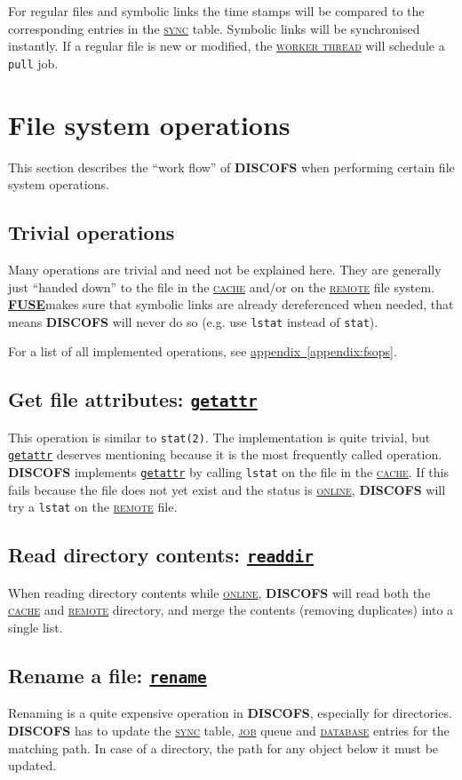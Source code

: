 \documentclass[a4paper]{article}
\newcommand{\software}[1]{\textsc{\textbf{#1}}\xspace}
\newcommand{\discofs}{\software{DISCOFS}}
\newcommand{\fuse}{\href{http://fuse.sourceforge.net/}{\software{FUSE}\xspace}}
\newcommand{\keyword}[1]{\hyperref[keyword:#1]{\textsc{#1}}\xspace}
\newcommand{\job}{\keyword{job}}
\newcommand{\jobtype}[1]{\texttt{#1}\xspace}
\newcommand{\pull}{\jobtype{pull}}
\newcommand{\sync}{\keyword{sync}}
\newcommand{\cache}{\keyword{cache}}
\newcommand{\remote}{\keyword{remote}}
\newcommand{\database}{\keyword{database}}
\newcommand{\online}{\keyword{online}}
\newcommand{\workerthread}{\hyperref[keyword:workerthread]{\textsc{worker thread}}\xspace}
\newcommand{\fsopref}[1]{\hyperref[fsop:#1]{\texttt{#1}}}
\begin{document}
For regular files and symbolic links the time stamps will be compared to the
corresponding entries in the \sync table. Symbolic links will be synchronised
instantly. If a regular file is new or modified, the \workerthread will
schedule a \pull job.



\section{File system operations} %
This section describes the ``work flow'' of \discofs when performing certain
file system operations.

\subsection{Trivial operations} %
Many operations are trivial and need not be explained here. They are generally
just ``handed down'' to the file in the \cache and/or on the \remote file
system. \fuse makes sure that symbolic links are already dereferenced when
needed, that means \discofs will never do so (e.g. use \texttt{lstat} instead of
\texttt{stat}).

For a list of all implemented operations, see
\hyperref[appendix:fsops]{appendix~\ref{appendix:fsops}}.


\subsection{Get file attributes: \fsopref{getattr}} %
This operation is similar to \texttt{stat(2)}. The implementation is quite
trivial, but \fsopref{getattr} deserves mentioning because it is the most
frequently called operation. \discofs implements \fsopref{getattr} by calling
\texttt{lstat} on the file in the \cache. If this fails because the file does
not yet exist and the status is \online, \discofs will try a \texttt{lstat} on the
\remote file.

\subsection{Read directory contents: \fsopref{readdir}} %
When reading directory contents while \online, \discofs will read both the
\cache and \remote directory, and merge the contents (removing duplicates) into
a single list.

\subsection{Rename a file: \fsopref{rename}} %
Renaming is a quite expensive operation in \discofs, especially for directories.
\discofs has to update the \sync table, \job queue and \database entries for the
matching path. In case of a directory, the path for any object below it must be
updated.
\end{document}
